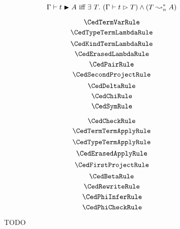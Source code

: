 
\begin{figure}
    \centering
    $$\Gamma \vdash t \blacktriangleright A \text{ iff } \exists\ T.\ (\Gamma \vdash t \vartriangleright T) \wedge (T \leadsto^*_n A)$$
    \begin{minipage}{0.5\textwidth}
        $$\CedTermVarRule$$
        $$\CedTypeTermLambdaRule$$
        $$\CedKindTermLambdaRule$$
        $$\CedErasedLambdaRule$$
        $$\CedPairRule$$
        $$\CedSecondProjectRule$$
        $$\CedDeltaRule$$
        $$\CedChiRule$$
        $$\CedSymRule$$
    \end{minipage}%
    \begin{minipage}{0.5\textwidth}
        $$\CedCheckRule$$
        $$\CedTermTermApplyRule$$
        $$\CedTypeTermApplyRule$$
        $$\CedErasedApplyRule$$
        $$\CedFirstProjectRule$$
        $$\CedBetaRule$$
        $$\CedRewriteRule$$
        $$\CedPhiInferRule$$
        $$\CedPhiCheckRule$$
    \end{minipage}%
    \caption{
        TODO
    }
    \label{fig:4:term}
\end{figure}

